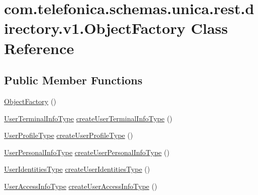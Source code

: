 \hypertarget{classcom_1_1telefonica_1_1schemas_1_1unica_1_1rest_1_1directory_1_1v1_1_1ObjectFactory}{
\section{com.telefonica.schemas.unica.rest.directory.v1.ObjectFactory Class Reference}
\label{classcom_1_1telefonica_1_1schemas_1_1unica_1_1rest_1_1directory_1_1v1_1_1ObjectFactory}
}
\subsection*{Public Member Functions}
\begin{DoxyCompactItemize}
\item 
\hyperlink{classcom_1_1telefonica_1_1schemas_1_1unica_1_1rest_1_1directory_1_1v1_1_1ObjectFactory_a20630e76a10cd91454aa7e42e9ce1c3d}{ObjectFactory} ()
\item 
\hyperlink{classcom_1_1telefonica_1_1schemas_1_1unica_1_1rest_1_1directory_1_1v1_1_1UserTerminalInfoType}{UserTerminalInfoType} \hyperlink{classcom_1_1telefonica_1_1schemas_1_1unica_1_1rest_1_1directory_1_1v1_1_1ObjectFactory_a12a660a6774cdc76a97740dbed760242}{createUserTerminalInfoType} ()
\item 
\hyperlink{classcom_1_1telefonica_1_1schemas_1_1unica_1_1rest_1_1directory_1_1v1_1_1UserProfileType}{UserProfileType} \hyperlink{classcom_1_1telefonica_1_1schemas_1_1unica_1_1rest_1_1directory_1_1v1_1_1ObjectFactory_ac8759014ae156ca8b6c345f221efa0f1}{createUserProfileType} ()
\item 
\hyperlink{classcom_1_1telefonica_1_1schemas_1_1unica_1_1rest_1_1directory_1_1v1_1_1UserPersonalInfoType}{UserPersonalInfoType} \hyperlink{classcom_1_1telefonica_1_1schemas_1_1unica_1_1rest_1_1directory_1_1v1_1_1ObjectFactory_a1ef2c530a833558e42665bd9f65fc6ac}{createUserPersonalInfoType} ()
\item 
\hyperlink{classcom_1_1telefonica_1_1schemas_1_1unica_1_1rest_1_1directory_1_1v1_1_1UserIdentitiesType}{UserIdentitiesType} \hyperlink{classcom_1_1telefonica_1_1schemas_1_1unica_1_1rest_1_1directory_1_1v1_1_1ObjectFactory_a49b31d67d0b0ceb7d9505f78205d3556}{createUserIdentitiesType} ()
\item 
\hyperlink{classcom_1_1telefonica_1_1schemas_1_1unica_1_1rest_1_1directory_1_1v1_1_1UserAccessInfoType}{UserAccessInfoType} \hyperlink{classcom_1_1telefonica_1_1schemas_1_1unica_1_1rest_1_1directory_1_1v1_1_1ObjectFactory_a3e7e273998a7d87542e5643f94afc261}{createUserAccessInfoType} ()

\end{DoxyCompactItemize}
